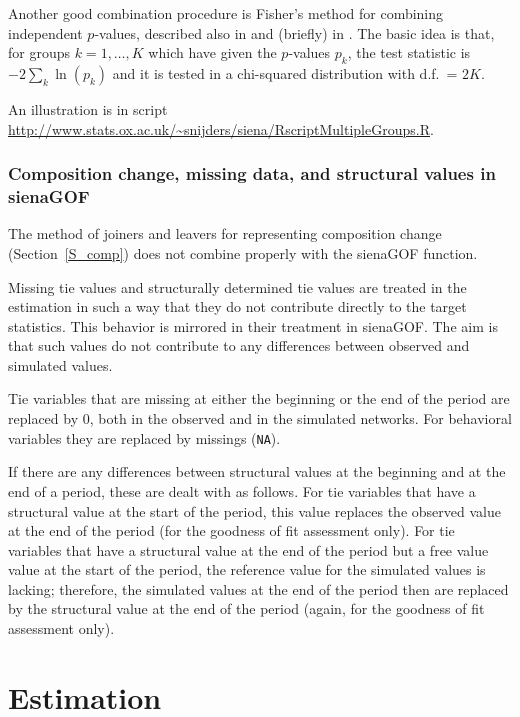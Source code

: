 \documentclass[a4paper,fleqn,11pt]{article}
\newcommand{\+}{\, + \,}
\begin{document}
Another good combination procedure is
Fisher's method for combining independent $p$-values, described also in
\citet{HedgesOlkin85} and (briefly) in \citet[Chapter 3]{SnijdersBosker12}.
The basic idea is that, for groups $k = 1, \ldots, K$
which have given the $p$-values $p_k$, the test statistic is
$- 2 \sum_k \ln(p_k)$ and it is tested in a chi-squared distribution
with d.f.\ = $2K$.

An illustration is in script \\
\url{http://www.stats.ox.ac.uk/~snijders/siena/RscriptMultipleGroups.R}.



\subsubsection{Composition change, missing data, and structural values in \textsf{sienaGOF} }


The method of joiners and leavers for representing composition change
(Section~\ref{S_comp}) does not combine properly with the \textsf{sienaGOF} function.


Missing tie values and structurally determined tie values are treated
in the estimation in such a way that they do not contribute directly
to the target statistics. This behavior is mirrored in their treatment
in \textsf{sienaGOF}. The aim is that such values do not contribute
to any differences between observed and simulated values.

Tie variables that are missing at either the beginning or the end of the period
are replaced by 0, both in the observed and in the simulated networks.
For behavioral variables they are replaced by missings (\texttt{NA}).

If there are any differences between structural values at the beginning and
at the end of a period, these are dealt with as follows.
For tie variables that have a structural value at the start of the period,
this value replaces the observed value at the end of the period
(for the goodness of fit assessment only).
For tie variables that have a structural value at the end of the period
but a free value value at the start of the period, the reference value for
the simulated values is lacking; therefore, the simulated values at the end
of the period then are replaced by the structural value at the end of the period
(again, for the goodness of fit assessment only).


\newpage

\section{Estimation}
\label{S_Est}
\end{document}
